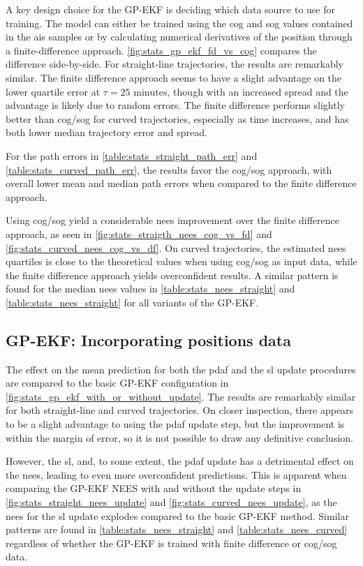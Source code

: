 A key design choice for the GP-EKF is deciding which data source to use for training. The model can either be trained using the \acrshort{cog} and \acrshort{sog} values contained in the \acrshort{ais} samples or by calculating numerical derivatives of the position through a finite-difference approach. \cref{fig:stats_gp_ekf_fd_vs_cog} compares the difference side-by-side. For straight-line trajectories, the results are remarkably similar. The finite difference approach seems to have a slight advantage on the lower quartile error at $\tau=25 \text{ minutes}$, though with an increased spread and the advantage is likely due to random errors. The finite difference performs slightly better than \acrshort{cog}/\acrshort{sog} for curved trajectories, especially as time increases, and has both lower median trajectory error and spread.

For the path errors in \cref{table:stats_straight_path_err} and \cref{table:stats_curved_path_err}, the results favor the \acrshort{cog}/\acrshort{sog} approach, with overall lower mean and median path errors when compared to the finite difference approach.

Using \acrshort{cog}/\acrshort{sog} yield a considerable \acrshort{nees} improvement over the finite difference approach, as seen in \cref{fig:stats_straigth_nees_cog_vs_fd} and \cref{fig:stats_curved_nees_cog_vs_df}. On curved trajectories, the estimated \acrshort{nees} quartiles is close to the theoretical values when using \acrshort{cog}/\acrshort{sog} as input data, while the finite difference approach yields overconfident results. A similar pattern is found for the median \acrshort{nees} values in \cref{table:stats_nees_straight} and \cref{table:stats_nees_straight} for all variants of the GP-EKF. 

\subsection{GP-EKF: Incorporating positions data}
The effect on the mean prediction for both the \acrshort{pdaf} and the \acrshort{sl} update procedures are compared to the basic GP-EKF configuration in \cref{fig:stats_gp_ekf_with_or_without_update}. The results are remarkably similar for both straight-line and curved trajectories. On closer inspection, there appears to be a slight advantage to using the \acrshort{pdaf} update step, but the improvement is within the margin of error, so it is not possible to draw any definitive conclusion.

However, the \acrshort{sl}, and, to some extent, the \acrshort{pdaf} update has a detrimental effect on the \acrshort{nees}, leading to even more overconfident predictions. This is apparent when comparing the GP-EKF NEES with and without the update steps in \cref{fig:stats_straight_nees_update} and \cref{fig:stats_curved_nees_update}, as the \acrshort{nees} for the \acrshort{sl} update explodes compared to the basic GP-EKF method. Similar patterns are found in \cref{table:stats_nees_straight} and \cref{table:stats_nees_curved} regardless of whether the GP-EKF is trained with finite difference or \acrshort{cog}/\acrshort{sog} data.

